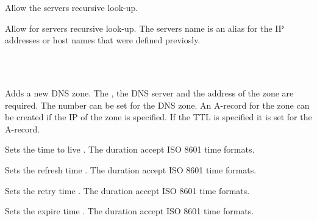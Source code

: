 Allow the servers recursive look-up.


Allow for servers  recursive look-up. The servers name is an alias
for the IP addresses or host names that were defined previosly.

\\
\TheStatement*{[, address: \Arg{address}] [, ttl: \Arg{time}] [, \{ ttl refresh retry}\\
\TheStatement*{expire record \} ]}

Adds a new DNS zone. The , the  DNS server and 
the  address of the zone are required. The  number can
be set for the DNS zone.
An A-record for the zone
can be created if the IP  of the zone is specified. If the
TTL  is specified it is set for the A-record.


Sets the time to live . 
The duration accept ISO 8601 time formats.


Sets the refresh time .
The duration accept ISO 8601 time formats.


Sets the retry time .
The duration accept ISO 8601 time formats.


Sets the expire time .
The duration accept ISO 8601 time formats.

\\

